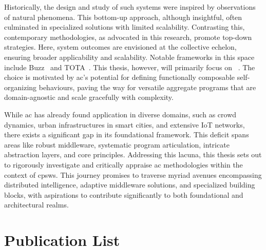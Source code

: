 Historically, the design and study of such systems were inspired by observations of natural phenomena. 
 This bottom-up approach, although insightful, often culminated in specialized solutions with limited scalability. 
 Contrasting this, contemporary methodologies, as advocated in this research, promote top-down strategies. 
 Here, system outcomes are envisioned at the collective echelon, ensuring broader applicability and scalability. 
 Notable frameworks in this space include Buzz~\cite{DBLP:journals/software/PinciroliB16} and TOTA~\cite{DBLP:conf/icdcsw/MameiZL03}. 
%
This thesis, however, will primarily focus on ~\cite{DBLP:journals/computer/BealPV15}. 
 The choice is motivated by \ac{ac}'s potential for defining functionally composable self-organizing behaviours, 
 paving the way for versatile aggregate programs that are domain-agnostic and scale gracefully with complexity.

While \ac{ac} has already found application in diverse domains, 
 such as crowd dynamics, urban infrastructures in smart cities, and extensive IoT networks, 
 there exists a significant gap in its foundational framework. 
%
This deficit spans areas like robust middleware, systematic program articulation, intricate abstraction layers, and core principles.
%
Addressing this lacuna, this thesis sets out to rigorously investigate and critically appraise \ac{ac} methodologies within the context of \acp{cpsw}. 
%
This journey promises to traverse myriad avenues encompassing distributed intelligence, adaptive middleware solutions, and specialized building blocks, with aspirations to contribute significantly to both foundational and architectural realms.

\section{Publication List}
